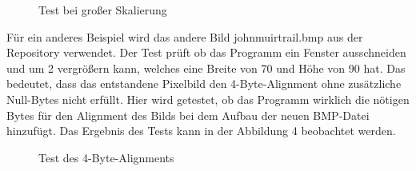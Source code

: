 \documentclass[course=erap]{aspdoc}
\begin{document}
\begin{figure}[ht]
        \caption{Test bei großer Skalierung}%
        \label{fig:enter-label2}
    \end{figure}

    Für ein anderes Beispiel wird das andere Bild johnmuirtrail.bmp aus der Repository verwendet. Der Test prüft ob das
    Programm ein Fenster ausschneiden und um 2 vergrößern kann, welches eine Breite von 70 und Höhe von 90 hat. Das bedeutet,
    dass das entstandene Pixelbild den 4-Byte-Alignment ohne zusätzliche Null-Bytes nicht erfüllt.
    Hier wird getestet, ob das Programm wirklich die nötigen Bytes für den Alignment des Bilds
    bei dem Aufbau der neuen BMP-Datei hinzufügt. Das Ergebnis des Tests kann in der Abbildung 4 beobachtet werden.

    \begin{figure}[ht]%
        \centering
        \qquad
        \caption{Test des 4-Byte-Alignments}%
        \label{fig:enter-label3}
    \end{figure}
\end{document}
